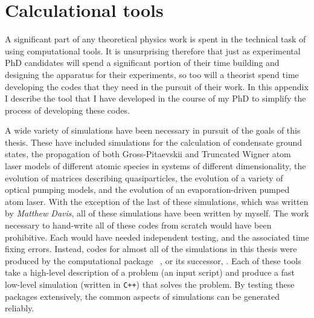 \chapter{Calculational tools}
\label{ToolsAppendix}
\graphicspath{{Figures/ToolsAppendix/}{Figures/Common/}}

A significant part of any theoretical physics work is spent in the technical task of using computational tools.  It is unsurprising therefore that just as experimental PhD candidates will spend a significant portion of their time building and designing the apparatus for their experiments, so too will a theorist spend time developing the codes that they need in the pursuit of their work.  In this appendix I describe the tool that I have developed in the course of my PhD to simplify the process of developing these codes.  %

\parasep

A wide variety of simulations have been necessary in pursuit of the goals of this thesis.  These have included simulations for the calculation of condensate ground states, the propagation of both Gross-Pitaevskii and Truncated Wigner atom laser models of different atomic species in systems of different dimensionality, the evolution of matrices describing quasiparticles, the evolution of a variety of optical pumping models, and the evolution of an evaporation-driven pumped atom laser.  With the exception of the last of these simulations, which was written by \emph{Matthew Davis}, all of these simulations have been written by myself.  The work necessary to hand-write all of these codes from scratch would have been prohibitive.  Each would have needed independent testing, and the associated time fixing errors.  Instead, codes for almost all of the simulations in this thesis were produced by the computational package \XMDS\ \citep{Collecutt:2001}, or its successor, \xpdeint.  Each of these tools take a high-level description of a problem (an input script) and produce a fast low-level simulation (written in \texttt{C++}) that solves the problem.  By testing these packages extensively, the common aspects of simulations can be generated reliably.

